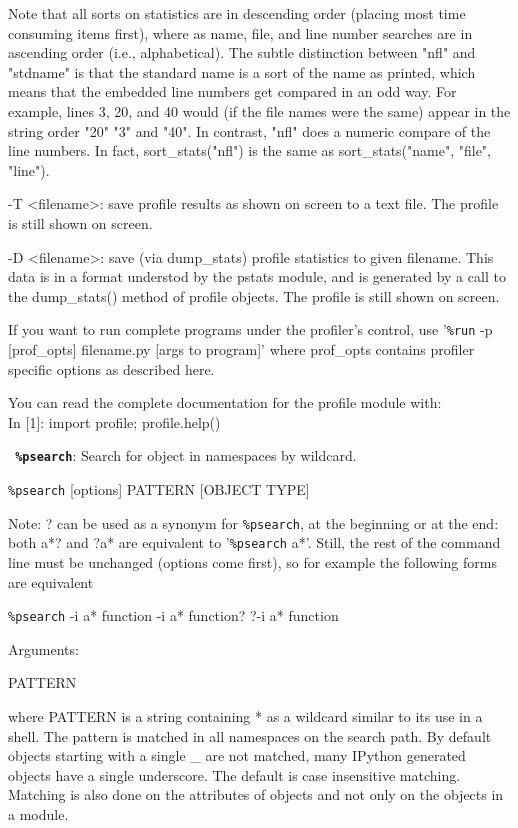         Note that all sorts on statistics are in descending order (placing
        most time consuming items first), where as name, file, and line number
        searches are in ascending order (i.e., alphabetical). The subtle
        distinction between "nfl" and "stdname" is that the standard name is a
        sort of the name as printed, which means that the embedded line
        numbers get compared in an odd way.  For example, lines 3, 20, and 40
        would (if the file names were the same) appear in the string order
        "20" "3" and "40".  In contrast, "nfl" does a numeric compare of the
        line numbers.  In fact, sort\_stats("nfl") is the same as
        sort\_stats("name", "file", "line").

        -T <filename>: save profile results as shown on screen to a text
        file. The profile is still shown on screen.

        -D <filename>: save (via dump\_stats) profile statistics to given
        filename. This data is in a format understod by the pstats module, and
        is generated by a call to the dump\_stats() method of profile
        objects. The profile is still shown on screen.

        If you want to run complete programs under the profiler's control, use
        '\texttt{\%run} -p [prof\_opts] filename.py [args to program]' where prof\_opts
        contains profiler specific options as described here.
        
        You can read the complete documentation for the profile module with:\\
          In [1]: import profile; profile.help() 

\bigskip
\texttt{\textbf{ \%psearch}}:
	Search for object in namespaces by wildcard.

        \texttt{\%psearch} [options] PATTERN [OBJECT TYPE]

        Note: ? can be used as a synonym for \texttt{\%psearch}, at the beginning or at
        the end: both a*? and ?a* are equivalent to '\texttt{\%psearch} a*'.  Still, the
        rest of the command line must be unchanged (options come first), so
        for example the following forms are equivalent

        \texttt{\%psearch} -i a* function
        -i a* function?
        ?-i a* function

        Arguments:
        
          PATTERN

          where PATTERN is a string containing * as a wildcard similar to its
          use in a shell.  The pattern is matched in all namespaces on the
          search path. By default objects starting with a single \_ are not
          matched, many IPython generated objects have a single
          underscore. The default is case insensitive matching. Matching is
          also done on the attributes of objects and not only on the objects
          in a module.

